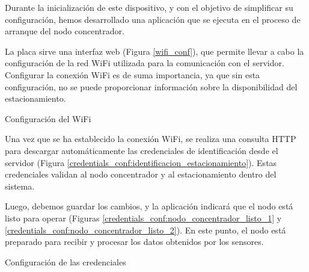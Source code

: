 Durante la inicialización de este dispositivo, y con el objetivo de simplificar su configuración, hemos desarrollado una aplicación que se ejecuta en el proceso de arranque del nodo concentrador.

La placa sirve una interfaz web (Figura \ref{wifi_conf}), que permite llevar a cabo la configuración de la red WiFi utilizada para la comunicación con el servidor. Configurar la conexión WiFi es de suma importancia, ya que sin esta configuración, no se puede proporcionar información sobre la disponibilidad del estacionamiento.

\begin{images}[\label{wifi_conf}]{Configuración del WiFi}
\end{images}

Una vez que se ha establecido la conexión WiFi, se realiza una consulta HTTP para descargar automáticamente las credenciales de identificación desde el servidor (Figura \ref{credentials_conf:identificacion_estacionamiento}). Estas credenciales validan al nodo concentrador y al estacionamiento dentro del sistema.

Luego, debemos guardar los cambios, y la aplicación indicará que el nodo está listo para operar (Figuras \ref{credentials_conf:nodo_concentrador_listo_1} y \ref{credentials_conf:nodo_concentrador_listo_2}). En este punto, el nodo está preparado para recibir y procesar los datos obtenidos por los sensores.


\begin{images}[\label{credentials_conf}]{Configuración de las credenciales}
\end{images}


